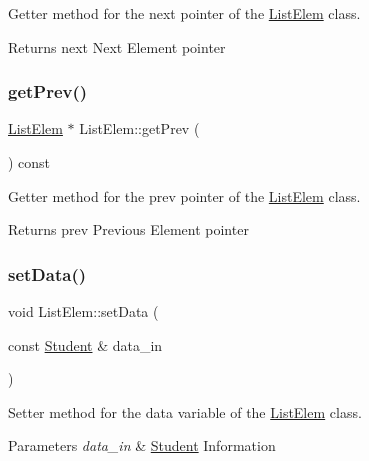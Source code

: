 Getter method for the \textquotesingle{}next\textquotesingle{} pointer of the \hyperlink{class_list_elem}{List\+Elem} class. 

\begin{DoxyReturn}{Returns}
next Next Element pointer 
\end{DoxyReturn}
\mbox{\label{class_list_elem_a5e0941e76c8f85252a84d3ba3b874bc3}} 
\subsubsection{\texorpdfstring{get\+Prev()}{getPrev()}}
{\footnotesize\ttfamily \hyperlink{class_list_elem}{List\+Elem} $\ast$ List\+Elem\+::get\+Prev (\begin{DoxyParamCaption}{ }\end{DoxyParamCaption}) const}



Getter method for the \textquotesingle{}prev\textquotesingle{} pointer of the \hyperlink{class_list_elem}{List\+Elem} class. 

\begin{DoxyReturn}{Returns}
prev Previous Element pointer 
\end{DoxyReturn}
\mbox{\label{class_list_elem_a2eece4a9fa40234ee6529c0b50480694}} 
\subsubsection{\texorpdfstring{set\+Data()}{setData()}}
{\footnotesize\ttfamily void List\+Elem\+::set\+Data (\begin{DoxyParamCaption}\item[{const \hyperlink{class_student}{Student} \&}]{data\+\_\+in }\end{DoxyParamCaption})}



Setter method for the \textquotesingle{}data\textquotesingle{} variable of the \hyperlink{class_list_elem}{List\+Elem} class. 


\begin{DoxyParams}{Parameters}
{\em data\+\_\+in} & \hyperlink{class_student}{Student} Information \\
\hline
\end{DoxyParams}
\mbox{\label{class_list_elem_abe9b94948ec904d86a8d1b2218b05396}} 
